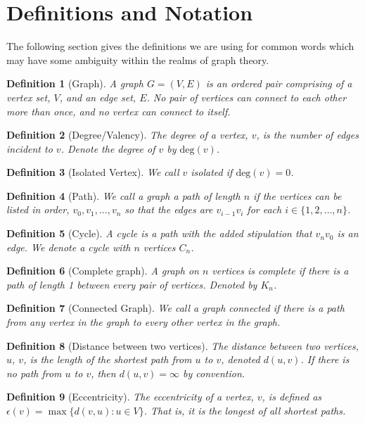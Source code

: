 \documentclass[a4paper]{article}
\newtheorem*{definition*}{Definition}
\renewcommand{\deg}[1]{\text{deg}#1}
\begin{document}
\section{Definitions and Notation}
The following section gives the definitions we are using for common words which may have some ambiguity within the realms of graph theory.
\begin{definition*}[Graph]
A graph $G = (V, E)$ is an ordered pair comprising of a vertex set, $V$, and an edge set, $E$. No pair of vertices can connect to each other more than once, and no vertex can connect to itself.
\end{definition*}
\begin{definition*}[Degree/Valency]
The degree of a vertex, $v$, is the number of edges incident to $v$. Denote the degree of $v$ by $\deg(v)$.
\end{definition*}
\begin{definition*}[Isolated Vertex]
We call $v$ isolated if $\deg(v)=0$.
\end{definition*}
\begin{definition*}[Path]
We call a graph a path of length $n$ if the vertices can be listed in order, $v_0, v_1, \ldots, v_n$ so that the edges are $v_{i-1}v_i$ for each $i\in\{1, 2, \ldots, n\}$.
\end{definition*}
\begin{definition*}[Cycle]
A cycle is a path with the added stipulation that $v_nv_0$ is an edge. We denote a cycle with $n$ vertices $C_n$.
\end{definition*}
\begin{definition*}[Complete graph]
A graph on $n$ vertices is complete if there is a path of length 1 between every pair of vertices. Denoted by $K_n$.
\end{definition*}
\begin{definition*}[Connected Graph]
We call a graph connected if there is a path from any vertex in the graph to every other vertex in the graph.
\end{definition*}
\begin{definition*}[Distance between two vertices]
The distance between two vertices, $u$, $v$, is the length of the shortest path from $u$ to $v$, denoted $d(u, v)$. If there is no path from $u$ to $v$, then $d(u,v)=\infty$ by convention.
\end{definition*}
\begin{definition*}[Eccentricity]
The eccentricity of a vertex, $v$, is defined as $\epsilon(v)=\max\{d(v,u) : u\in V\}$. That is, it is the longest of all shortest paths.
\end{definition*}
\end{document}
